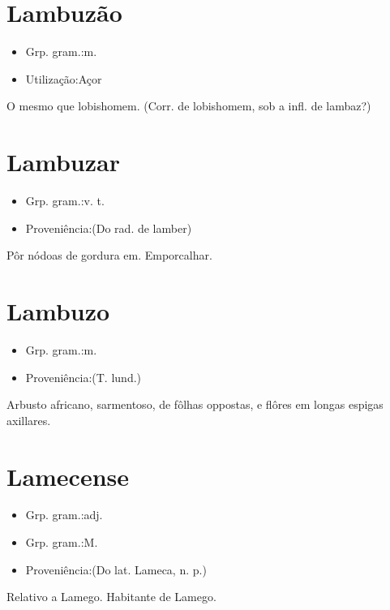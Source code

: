 \section{Lambuzão}
\begin{itemize}
\item {Grp. gram.:m.}
\end{itemize}
\begin{itemize}
\item {Utilização:Açor}
\end{itemize}
O mesmo que \textunderscore lobishomem\textunderscore .
(Corr. de \textunderscore lobishomem\textunderscore , sob a infl. de \textunderscore lambaz\textunderscore ?)
\section{Lambuzar}
\begin{itemize}
\item {Grp. gram.:v. t.}
\end{itemize}
\begin{itemize}
\item {Proveniência:(Do rad. de \textunderscore lamber\textunderscore )}
\end{itemize}
Pôr nódoas de gordura em.
Emporcalhar.
\section{Lambuzo}
\begin{itemize}
\item {Grp. gram.:m.}
\end{itemize}
\begin{itemize}
\item {Proveniência:(T. lund.)}
\end{itemize}
Arbusto africano, sarmentoso, de fôlhas oppostas, e flôres em longas espigas axillares.
\section{Lamecense}
\begin{itemize}
\item {Grp. gram.:adj.}
\end{itemize}
\begin{itemize}
\item {Grp. gram.:M.}
\end{itemize}
\begin{itemize}
\item {Proveniência:(Do lat. \textunderscore Lameca\textunderscore , n. p.)}
\end{itemize}
Relativo a Lamego.
Habitante de Lamego.
